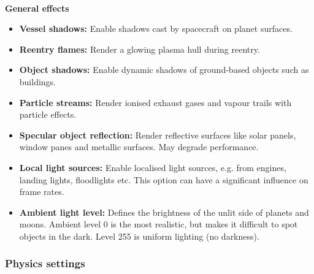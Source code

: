 \documentclass[Orbiter User Manual.tex]{subfiles}
\begin{document}
\noindent
\\
\textbf{General effects}
\begin{itemize}
\item \textbf{Vessel shadows:} Enable shadows cast by spacecraft on planet surfaces.
\item \textbf{Reentry flames:} Render a glowing plasma hull during reentry.
\item \textbf{Object shadows:} Enable dynamic shadows of ground-based objects such as buildings.
\item \textbf{Particle streams:} Render ionised exhaust gases and vapour trails with particle effects.
\item \textbf{Specular object reflection:} Render reflective surfaces like solar panels, window panes and metallic surfaces. May degrade performance.
\item \textbf{Local light sources:} Enable localised light sources, e.g. from engines, landing lights, floodlights etc. This option can have a significant influence on frame rates.
\item \textbf{Ambient light level:} Defines the brightness of the unlit side of planets and moons. Ambient level 0 is the most realistic, but makes it difficult to spot objects in the dark. Level 255 is uniform lighting (no darkness).
\end{itemize}

\subsubsection{Physics settings}
\begin{figure}[H]
	\centering
\end{figure}
\end{document}
